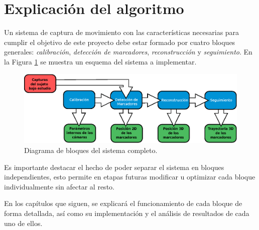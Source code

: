\section{Explicación del algoritmo}\label{implementacion}

Un sistema de captura de movimiento con las características necesarias para cumplir el objetivo de este proyecto debe estar formado por cuatro bloques generales: \emph{calibración}, \emph{detección de marcadores}, \emph{reconstrucción} y \emph{seguimiento}. En la Figura \ref{bloquesSist} se muestra un esquema del sistema a implementar.

\begin{figure}[ht!]
\centering
\hspace{-0.5cm}
\includegraphics[scale=0.5]{imagenes/Sistema_completo/Diagrama_de_bloques.eps}
\caption{Diagrama de bloques del sistema completo.}
\label{bloquesSist}
\end{figure}

Es importante destacar el hecho de poder separar el sistema en bloques independientes,
esto permite en etapas futuras modificar u optimizar cada bloque individualmente sin afectar al resto.

En los capítulos que siguen, se explicará el funcionamiento de cada bloque de forma detallada, así como su implementación y el análisis de resultados de cada uno de ellos.